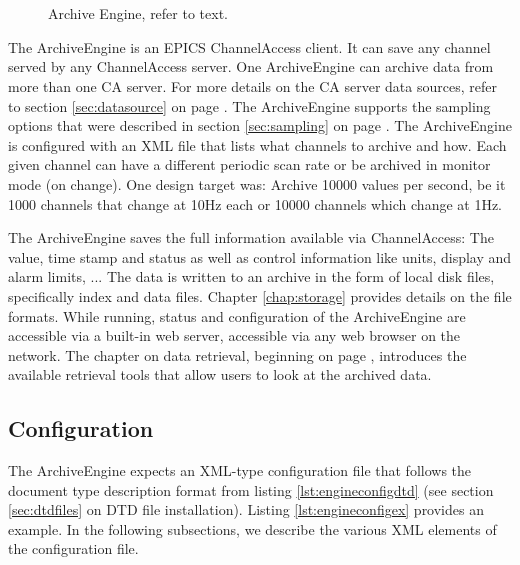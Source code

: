 \chapter{} \label{sec:engine}

\begin{figure}[htb]
\begin{center}
\end{center}
\caption{\label{fig:engine}Archive Engine, refer to text.}
\end{figure}

\noindent The ArchiveEngine is an EPICS ChannelAccess client. It can
save any channel served by any ChannelAccess server. One ArchiveEngine
can archive data from more than one CA server. For more details on the
CA server data sources, refer to section \ref{sec:datasource} on page
\pageref{sec:datasource}.  The ArchiveEngine supports the sampling
options that were described in section \ref{sec:sampling} on page
\pageref{sec:sampling}.  The ArchiveEngine is configured with an XML
file that lists what channels to archive and how. Each given channel
can have a different periodic scan rate or be archived in monitor mode
(on change).  One design target was: Archive 10000 values per second,
be it 1000 channels that change at 10Hz each or 10000 channels which
change at 1Hz.

The ArchiveEngine saves the full information available via
ChannelAccess: The value, time stamp and status as well as
control information like units, display and alarm limits, ...  
The data is written to an archive in the form of local disk files,
specifically index and data files.  Chapter \ref{chap:storage}
provides details on the file formats.
While running, status and configuration of the ArchiveEngine are
accessible via a built-in web server, accessible via any web browser
on the network.  The chapter on data retrieval, beginning on page
\pageref{chap:retrieval}, introduces the available retrieval tools
that allow users to look at the archived data.

\section{Configuration} \label{sec:engineconfig}
The ArchiveEngine expects an XML-type configuration file that follows
the document type description format from listing
\ref{lst:engineconfigdtd} (see section \ref{sec:dtdfiles} on DTD file
installation). Listing \ref{lst:engineconfigex} provides an
example. In the following subsections, we describe the various XML
elements of the configuration file.

